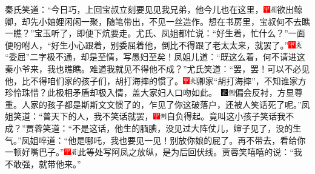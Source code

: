 秦氏笑道：``今日巧，上回宝叔立刻要见见我兄弟，他今儿也在这里，{\includegraphics[width=3mm]{../Images/00002}\includegraphics[width=3mm]{../Images/00010}\footnotesize \kaishu 欲出鲸卿，却先小妯娌闲闲一聚，随笔带出，不见一丝造作。}想在书房里，宝叔何不去瞧一瞧？''宝玉听了，即便下炕要走。尤氏、凤姐都忙说：``好生着，忙什么？''一面便吩咐人，``好生小心跟着，别委屈着他，倒比不得跟了老太太来，就罢了。''{\includegraphics[width=3mm]{../Images/00002}\includegraphics[width=3mm]{../Images/00012}\footnotesize \kaishu ``委屈''二字极不通，却是至情，写愚妇至矣！}凤姐儿道：``既这么着，何不请进这秦小爷来，我也瞧瞧。难道我就见不得他不成？''尤氏笑道：``罢，罢！可以不必见他，比不得咱们家的孩子们，胡打海摔的惯了。{{\includegraphics[width=3mm]{../Images/00002}\includegraphics[width=3mm]{../Images/00012}\footnotesize \kaishu 卿家``胡打海摔''，不知谁家方珍怜珠惜？此极相矛盾却极入情，盖大家妇人口吻如此。　}\includegraphics[width=3mm]{../Images/00006}\includegraphics[width=3mm]{../Images/00011}\footnotesize \kaishu 偏会反衬，方显尊重。}人家的孩子都是斯斯文文惯了的，乍见了你这破落户，还被人笑话死了呢。''凤姐笑道：``普天下的人，我不笑话就罢，{\includegraphics[width=3mm]{../Images/00002}\includegraphics[width=3mm]{../Images/00011}\footnotesize \kaishu 自负得起。}竟叫这小孩子笑话我不成？''贾蓉笑道：``不是这话，他生的腼腆，没见过大阵仗儿，婶子见了，没的生气。''凤姐啐道：``他是哪吒，我也要见一见！别放你娘的屁了。再不带去，看给你一顿好嘴巴子。''{\includegraphics[width=3mm]{../Images/00002}\includegraphics[width=3mm]{../Images/00010}\footnotesize \kaishu 此等处写阿凤之放纵，是为后回伏线。}贾蓉笑嘻嘻的说：``我不敢强，就带他来。''

